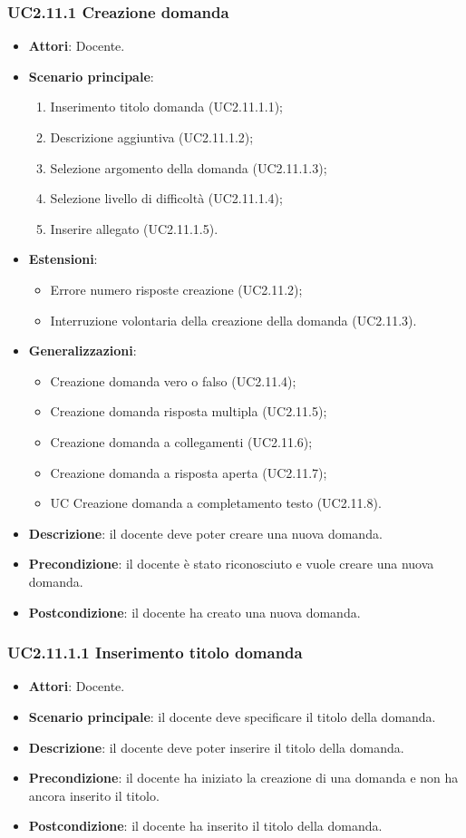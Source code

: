 \subsubsection{UC2.11.1 Creazione domanda}
\begin{itemize}
\item \textbf{Attori}: Docente.
\item \textbf{Scenario principale}:
\begin{enumerate}
\item Inserimento titolo domanda (UC2.11.1.1);
\item Descrizione aggiuntiva (UC2.11.1.2);
\item Selezione argomento della domanda (UC2.11.1.3);
\item Selezione livello di difficoltà (UC2.11.1.4);
\item Inserire allegato (UC2.11.1.5).
\end{enumerate}
\item \textbf{Estensioni}:
\begin{itemize}
\item Errore numero risposte creazione (UC2.11.2);
\item Interruzione volontaria della creazione della domanda (UC2.11.3).
\end{itemize}
\item \textbf{Generalizzazioni}:
\begin{itemize}
\item Creazione domanda vero o falso (UC2.11.4);
\item Creazione domanda risposta multipla (UC2.11.5);
\item Creazione domanda a collegamenti (UC2.11.6);
\item Creazione domanda a risposta aperta (UC2.11.7);
\item UC Creazione domanda a completamento testo (UC2.11.8).
\end{itemize}
\item \textbf{Descrizione}: il docente deve poter creare una nuova domanda.
\item \textbf{Precondizione}: il docente è stato riconosciuto e vuole creare una nuova domanda.
\item \textbf{Postcondizione}: il docente ha creato una nuova domanda.
\end{itemize}
\subsubsection{UC2.11.1.1 Inserimento titolo domanda}
\begin{itemize}
\item \textbf{Attori}: Docente.
\item \textbf{Scenario principale}: il docente deve specificare il titolo della domanda.
\item \textbf{Descrizione}: il docente deve poter inserire il titolo della domanda.
\item \textbf{Precondizione}: il docente ha iniziato la creazione di una domanda e non ha ancora inserito il titolo.
\item \textbf{Postcondizione}: il docente ha inserito il titolo della domanda.
\end{itemize}
